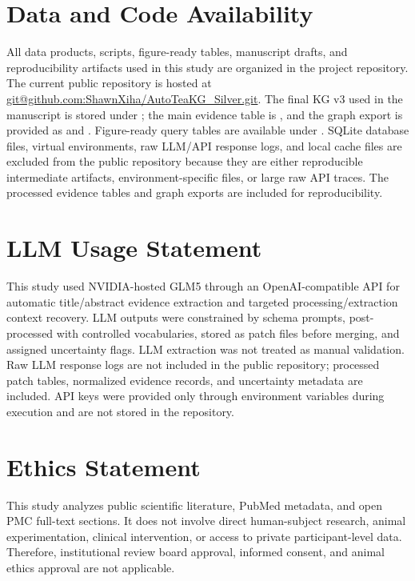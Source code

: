 \documentclass[11pt]{article}
\begin{document}
\section*{Data and Code Availability}

All data products, scripts, figure-ready tables, manuscript drafts, and reproducibility artifacts used in this study are organized in the project repository. The current public repository is hosted at \url{git@github.com:ShawnXiha/AutoTeaKG_Silver.git}. The final KG v3 used in the manuscript is stored under ; the main evidence table is , and the graph export is provided as  and . Figure-ready query tables are available under . SQLite database files, virtual environments, raw LLM/API response logs, and local cache files are excluded from the public repository because they are either reproducible intermediate artifacts, environment-specific files, or large raw API traces. The processed evidence tables and graph exports are included for reproducibility.

\section*{LLM Usage Statement}

This study used NVIDIA-hosted GLM5 through an OpenAI-compatible API for automatic title/abstract evidence extraction and targeted processing/extraction context recovery. LLM outputs were constrained by schema prompts, post-processed with controlled vocabularies, stored as patch files before merging, and assigned uncertainty flags. LLM extraction was not treated as manual validation. Raw LLM response logs are not included in the public repository; processed patch tables, normalized evidence records, and uncertainty metadata are included. API keys were provided only through environment variables during execution and are not stored in the repository.

\section*{Ethics Statement}

This study analyzes public scientific literature, PubMed metadata, and open PMC full-text sections. It does not involve direct human-subject research, animal experimentation, clinical intervention, or access to private participant-level data. Therefore, institutional review board approval, informed consent, and animal ethics approval are not applicable.
\end{document}
